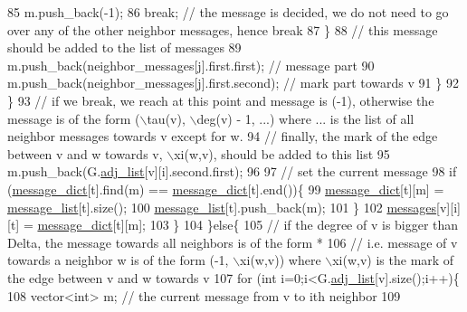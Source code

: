 \begin{DoxyCode}
85                 m.push\_back(-1);
86                 \textcolor{keywordflow}{break}; \textcolor{comment}{// the message is decided, we do not need to go over any of the other neighbor
       messages, hence break}
87               \}
88               \textcolor{comment}{// this message should be added to the list of messages}
89               m.push\_back(neighbor\_messages[j].first.first); \textcolor{comment}{// message part}
90               m.push\_back(neighbor\_messages[j].first.second); \textcolor{comment}{// mark part towards v}
91             \}
92           \}
93           \textcolor{comment}{// if we break, we reach at this point and message is (-1), otherwise the message is of the form
       (\(\backslash\)tau(v), \(\backslash\)deg(v) - 1, ...) where ... is the list of all neighbor messages towards v except for w. }
94           \textcolor{comment}{// finally, the mark of the edge between v and w towards v, \(\backslash\)xi(w,v), should be added to this
       list}
95           m.push\_back(G.\hyperlink{classmarked__graph_a1a0bf7ca413a278763f7c878b3b6fd6f}{adj\_list}[v][i].second.first);
96 
97           \textcolor{comment}{// set the current message}
98           \textcolor{keywordflow}{if} (\hyperlink{classgraph__message_ad0a6d35ac8550fb7ff03ce90fce7d5a5}{message\_dict}[t].find(m) == \hyperlink{classgraph__message_ad0a6d35ac8550fb7ff03ce90fce7d5a5}{message\_dict}[t].end())\{
99             \hyperlink{classgraph__message_ad0a6d35ac8550fb7ff03ce90fce7d5a5}{message\_dict}[t][m] = \hyperlink{classgraph__message_aa17fdb629b423343edfafa97252763ef}{message\_list}[t].size();
100             \hyperlink{classgraph__message_aa17fdb629b423343edfafa97252763ef}{message\_list}[t].push\_back(m);
101           \}
102           \hyperlink{classgraph__message_aac77e098f0acf9650116a8e51fe3b4b7}{messages}[v][i][t] = \hyperlink{classgraph__message_ad0a6d35ac8550fb7ff03ce90fce7d5a5}{message\_dict}[t][m];
103         \}
104       \}\textcolor{keywordflow}{else}\{
105         \textcolor{comment}{// if the degree of v is bigger than Delta, the message towards all neighbors is of the form *}
106         \textcolor{comment}{// i.e. message of v towards a neighbor w is of the form (-1, \(\backslash\)xi(w,v)) where \(\backslash\)xi(w,v) is the mark
       of the edge between v and w towards v}
107         \textcolor{keywordflow}{for} (\textcolor{keywordtype}{int} i=0;i<G.\hyperlink{classmarked__graph_a1a0bf7ca413a278763f7c878b3b6fd6f}{adj\_list}[v].size();i++)\{
108           vector<int> m; \textcolor{comment}{// the current message from v to ith neighbor}
109           

\end{DoxyCode}
